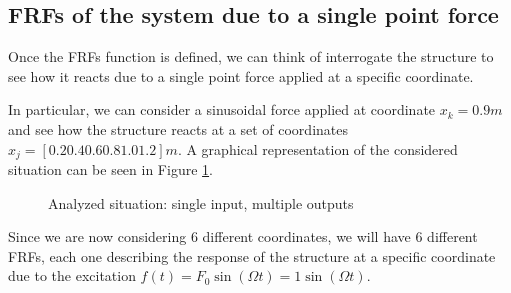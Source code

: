 \subsection{FRFs of the system due to a single point force}
\label{subsec:FRFs_of_the_system_due_to_a_single_point_force}

Once the FRFs function is defined, we can think of interrogate the structure to see how it reacts due to a single point force applied at a specific coordinate.

In particular, we can consider a sinusoidal force applied at coordinate $x_k = 0.9m$ and see how the structure reacts at a set of coordinates $x_j = [0.2 0.4 0.6 0.8 1.0 1.2]m$.
A graphical representation of the considered situation can be seen in Figure \ref{fig:beam_single_point_force}.

\begin{figure}[H]
    \centering
    \caption{Analyzed situation: single input, multiple outputs}
    \label{fig:beam_single_point_force}
\end{figure}

Since we are now considering $6$ different coordinates, we will have $6$ different FRFs, each one describing the response of the structure at a specific coordinate due to the excitation $f(t) = F_0 \sin(\Omega t) = 1 \sin(\Omega t)$.

